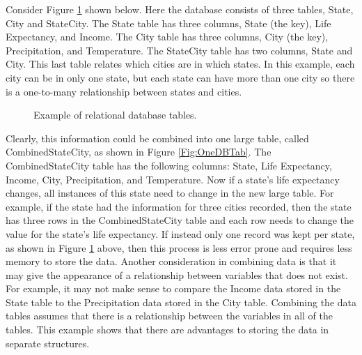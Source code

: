 \documentclass{article}[11pt]
\begin{document}
Consider Figure \ref{Fig:DBTab} shown below.  Here the database consists of
three tables, State, City and StateCity.  The State table has three columns,
State (the key), Life Expectancy, and Income.  The City table has three
columns, City (the key), Precipitation, and Temperature.  The StateCity table
has two columns, State and City.  This last table relates which cities are in
which states.  In this example, each city can be in only one state, but each
state can have more than one city so there is a one-to-many relationship
between states and cities.

\begin{figure}[ht]
  \begin{center}
    \caption{ Example of relational database tables. }
    \label{Fig:DBTab}
  \end{center}
\end{figure}

Clearly, this information could be combined into one large table, called
CombinedStateCity, as shown in Figure \ref{Fig:OneDBTab}.  The
CombinedStateCity table has the following columns: State, Life
Expectancy, Income, City, Precipitation, and Temperature.  Now if a state's
life expectancy changes, all instances of this state need to change
in the new large table.  For example, if the state had the information for
three cities recorded, then the state has three rows in the
CombinedStateCity table and each row needs to change the value for the
state's life expectancy.  If instead only one record was kept per state, as
shown in Figure \ref{Fig:DBTab} above, then this process is less error
prone and requires less memory to store the data.  Another consideration in
combining data is that it may give the appearance of a relationship
between variables that does not exist.  For example, it may not make sense to
compare the Income data stored in the State table to the Precipitation data
stored in the City table.  Combining the data tables assumes that there is a
relationship between the variables in all of the tables.  This example shows
that there are advantages to storing the data in separate structures.
\end{document}
